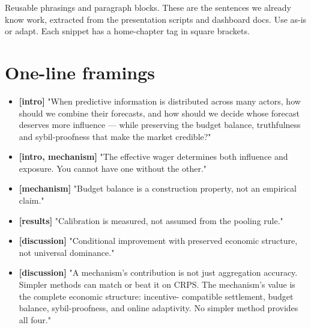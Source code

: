 \documentclass[11pt,a4paper,openany]{report}
\begin{document}
Reusable phrasings and paragraph blocks. These are the sentences we
already know work, extracted from the presentation scripts and dashboard
docs. Use as-is or adapt. Each snippet has a home-chapter tag in square
brackets.

\section{One-line framings}

\begin{itemize}
  \item \textbf{[intro]} "When predictive information is distributed across many
    actors, how should we combine their forecasts, and how should we
    decide whose forecast deserves more influence — while preserving the
    budget balance, truthfulness and sybil-proofness that make the market
    credible?"
\end{itemize}

\begin{itemize}
  \item \textbf{[intro, mechanism]} "The effective wager determines both influence
    and exposure. You cannot have one without the other."
\end{itemize}

\begin{itemize}
  \item \textbf{[mechanism]} "Budget balance is a construction property, not an
    empirical claim."
\end{itemize}

\begin{itemize}
  \item \textbf{[results]} "Calibration is measured, not assumed from the pooling
    rule."
\end{itemize}

\begin{itemize}
  \item \textbf{[discussion]} "Conditional improvement with preserved economic
    structure, not universal dominance."
\end{itemize}

\begin{itemize}
  \item \textbf{[discussion]} "A mechanism's contribution is not just aggregation
    accuracy. Simpler methods can match or beat it on CRPS. The
    mechanism's value is the complete economic structure: incentive-
    compatible settlement, budget balance, sybil-proofness, and online
    adaptivity. No simpler method provides all four."
\end{itemize}
\end{document}
